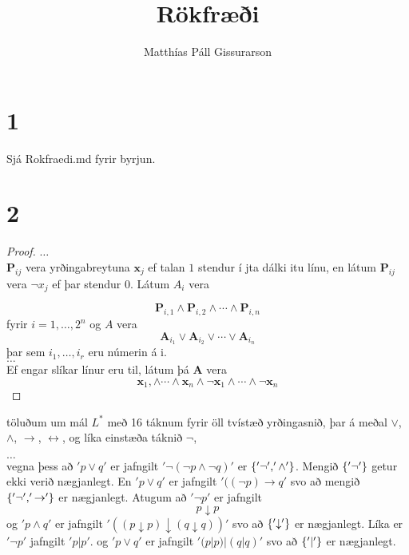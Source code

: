 \documentclass[12pt]{book}
\title{Rökfræði}
\author{Matthías Páll Gissurarson}
\begin{document}
\maketitle


\chapter{1}

Sjá Rokfraedi.md fyrir byrjun.

\chapter{2}
\begin{proof}
  $\hdots$ \\
  $ \textbf{P}_{ij}$ vera yrðingabreytuna $\textbf{x}_j$ ef talan $1$ stendur í
  j\-ta dálki i\-tu línu, en látum $\textbf{P}_{ij}$ vera $\lnot x_j$ ef
  þar stendur 0.  Látum $A_{i}$ vera

  \[ \textbf{P}_{i,1} \wedge \textbf{P}_{i,2} \wedge \dotsb \wedge
  \textbf{P}_{i,n} \] fyrir $i = 1, \dotsc, 2^n$ og $A$ vera
  \[ \textbf{A}_{i_1} \vee \textbf{A}_{i_2} \vee \dotsb \vee \textbf{A}_{i_n} \] þar
  sem $i_1, \dotsc, i_r$ eru númerin á i.\\

  $\hdots$ \\
  Ef engar slíkar línur eru til, látum þá $\textbf{A}$ vera
  \[ \textbf{x}_1, \wedge \dotsb \wedge \textbf{x}_n \wedge \lnot \textbf{x}_1 \wedge
  \dotsb \wedge \lnot \textbf{x}_n \]
\end{proof}

töluðum um mál $L^{*}$ með 16 táknum fyrir öll tvístæð yrðingasnið, þar á meðal
$\vee$, $\wedge$, $\rightarrow$, $\leftrightarrow$, og líka einstæða táknið $\lnot$,



$\hdots$\\


vegna þess að $'p \vee q'$ er jafngilt $'\lnot ( \lnot p \wedge  \lnot q)'$
er $\{'\lnot', '\wedge'\}$. Mengið $\{'\lnot'\}$ getur ekki verið nægjanlegt.
En $'p \vee q'$ er jafngilt $'((\lnot p) \rightarrow q'$ svo að mengið
$\{'\lnot', '\rightarrow'\}$ er nægjanlegt. Atugum að $'\lnot p'$ er jafngilt
\[p \downarrow p\]
og
$'p \wedge q'$ er jafngilt $'(( p \downarrow p) \downarrow (q \downarrow q))'$
svo að $\{'\downarrow'\}$ er nægjanlegt. Líka er
$'\lnot p'$ jafngilt $'p | p'$.
og $'p \vee q'$ er jafngilt $'(p | p) | (q|q)'$ svo að $\{'|'\}$ er nægjanlegt.
\end{document}

